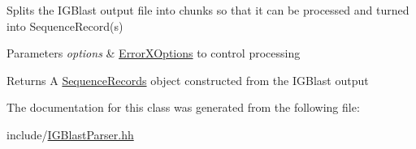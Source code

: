 Splits the I\+G\+Blast output file into chunks so that it can be processed and turned into Sequence\+Record(s)


\begin{DoxyParams}{Parameters}
{\em options} & \mbox{\hyperlink{classerrorx_1_1_error_x_options}{Error\+X\+Options}} to control processing\\
\hline
\end{DoxyParams}
\begin{DoxyReturn}{Returns}
A \mbox{\hyperlink{classerrorx_1_1_sequence_records}{Sequence\+Records}} object constructed from the I\+G\+Blast output 
\end{DoxyReturn}


The documentation for this class was generated from the following file\+:\begin{DoxyCompactItemize}
\item 
include/\mbox{\hyperlink{_i_g_blast_parser_8hh}{I\+G\+Blast\+Parser.\+hh}}\end{DoxyCompactItemize}
